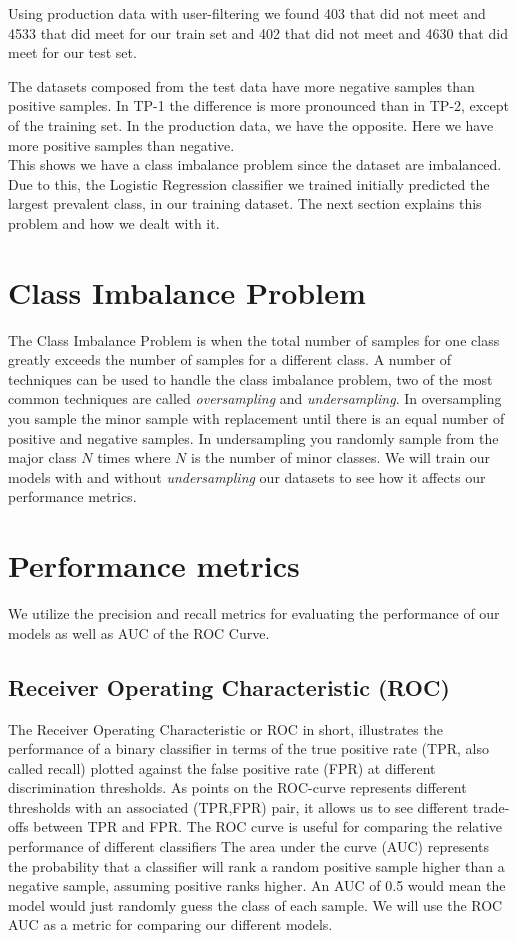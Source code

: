 Using production data with user-filtering we found 403 that did not meet and 4533 that did meet for our train set and 402 that did not meet and 4630 that did meet for our test set.

The datasets composed from the test data have more negative samples than positive samples. In TP-1 the difference is more pronounced than in TP-2, except of the training set. In the production data, we have the opposite. Here we have more positive samples than negative. \\
This shows we have a class imbalance problem since the dataset are imbalanced. Due to this, the Logistic Regression classifier we trained initially predicted the largest prevalent class, in our training dataset. The next section explains this problem and how we dealt with it. 


\section{Class Imbalance Problem}
\label{sec:class_imbalance_problem}
The Class Imbalance Problem is when the total number of samples for one class greatly exceeds the number of samples for a different class. A number of techniques can be used to handle the class imbalance problem, two of the most common techniques are called \textit{oversampling} and \textit{undersampling}\cite{tan2006introduction}. In oversampling you sample the minor sample with replacement until there is an equal number of positive and negative samples. In undersampling you randomly sample from the major class $N$ times where $N$ is the number of minor classes. We will train our models with and without \textit{undersampling} our datasets to see how it affects our performance metrics.

\section{Performance metrics}
\label{sec:performance_metrics}
We utilize the precision and recall metrics for evaluating the performance of our models as well as AUC of the ROC Curve.

\subsection{Receiver Operating Characteristic (ROC)}
The Receiver Operating Characteristic or ROC in short, illustrates the performance of a binary classifier in terms of the true positive rate (TPR, also called recall) plotted against the false positive rate (FPR) at different discrimination thresholds. As points on the ROC-curve represents different thresholds with an associated (TPR,FPR) pair, it allows us to see different trade-offs between TPR and FPR. The ROC curve is useful for comparing the relative performance of different classifiers\cite{tan2006introduction} The area under the curve (AUC) represents the probability that a classifier will rank a random positive sample higher than a negative sample, assuming positive ranks higher. An AUC of 0.5 would mean the model would just randomly guess the class of each sample. We will use the ROC AUC as a metric for comparing our different models.

